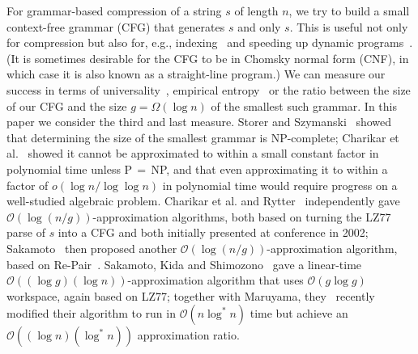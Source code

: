 \documentclass[runningheads]{llncs}
\newcommand{\Oh}[1]
    {\ensuremath{\mathcal{O}\!\left( {#1} \right)}}
\begin{document}
For grammar-based compression of a string $s$ of length $n$, we try to build a small context-free grammar (CFG) that generates $s$ and only $s$.  This is useful not only for compression but also for, e.g., indexing~\cite{CN09,Lif07} and speeding up dynamic programs~\cite{LMWZ09}.  (It is sometimes desirable for the CFG to be in Chomsky normal form (CNF), in which case it is also known as a straight-line program.)  We can measure our success in terms of universality~\cite{KY00}, empirical entropy~\cite{NR08} or the ratio between the size of our CFG and the size \(g = \Omega (\log n)\) of the smallest such grammar.  In this paper we consider the third and last measure.  Storer and Szymanski~\cite{SS82} showed that determining the size of the smallest grammar is NP-complete; Charikar et al.~\cite{CLLP+05} showed it cannot be approximated to within a small constant factor in polynomial time unless P\,$=$\,NP, and that even approximating it to within a factor of \(o (\log n / \log \log n)\) in polynomial time would require progress on a well-studied algebraic problem.  Charikar et al. and Rytter~\cite{Ryt03} independently gave $\Oh{\log (n / g)}$-approximation algorithms, both based on turning the LZ77~\cite{ZL77} parse of $s$ into a CFG and both initially presented at conference in 2002; Sakamoto~\cite{Sak05} then proposed another $\Oh{\log (n / g)}$-approximation algorithm, based on Re-Pair~\cite{LM00}.  Sakamoto, Kida and Shimozono~\cite{SKS04} gave a linear-time $\Oh{(\log g) (\log n)}$-approximation algorithm that uses $\Oh{g \log g}$ workspace, again based on LZ77; together with Maruyama, they~\cite{SMKS09} recently modified their algorithm to run in $\Oh{n \log^* n}$ time but achieve an $\Oh{(\log n) (\log^* n)}$ approximation ratio.
\end{document}
